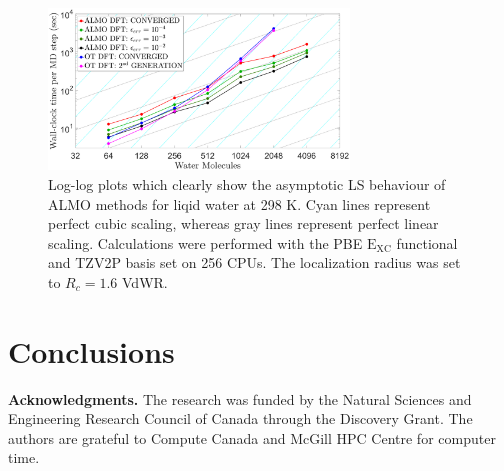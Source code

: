 \documentclass[10pt,aps,prl,twocolumn,amsmath,amssymb,superscriptaddress,longbibliography]{revtex4-1}
\begin{document}
\begin{figure}
\includegraphics[trim={2.8cm 0.4cm 3.5cm 1.2cm},clip,width=8cm]{strongscaling_log.eps}
\caption{\label{fig:strongscaling_log} Log-log plots which clearly show the asymptotic LS behaviour of ALMO methods for liqid water at 298 K. 
Cyan lines represent perfect cubic scaling, whereas gray lines represent perfect linear scaling. 
Calculations were performed with the PBE $\mathrm{E_{XC}}$ functional and TZV2P basis set on 256 CPUs. 
The localization radius was set to $R_{c} = 1.6$ VdWR.}
\end{figure}



\section{Conclusions} 

\textbf{Acknowledgments.} The research was funded by the Natural Sciences and Engineering Research Council of Canada through the Discovery Grant. The authors are grateful to Compute Canada and McGill HPC Centre for computer time.



\end{document}
